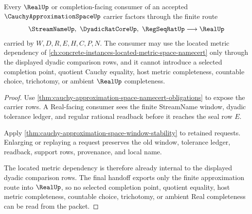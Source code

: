 \begin{theorem}
\label{thm:cauchy-approximation-space-real-handoff}
Every $\RealUp$ or completion-facing consumer of an accepted $\CauchyApproximationSpaceUp$ carrier factors through the finite route
$$
\StreamNameUp,\ \DyadicRatCoreUp,\ \RegSeqRatUp \longrightarrow \RealUp
$$
carried by $W,D,R,E,H,C,P,N$. The consumer may use the located metric dependency of \autoref{ch:concrete-instances-located-metric-space-namecert} only through the displayed dyadic comparison rows, and it cannot introduce a selected completion point, quotient Cauchy equality, host metric completeness, countable choice, trichotomy, or ambient $\RealUp$ completeness.
\end{theorem}
\begin{proof}
Use \autoref{thm:cauchy-approximation-space-namecert-obligations} to expose the carrier rows. A Real-facing consumer sees the finite StreamName window, dyadic tolerance ledger, and regular rational readback before it reaches the seal row $E$.

Apply \autoref{thm:cauchy-approximation-space-window-stability} to retained requests. Enlarging or replaying a request preserves the old window, tolerance ledger, readback, support rows, provenance, and local name.

The located metric dependency is therefore already internal to the displayed dyadic comparison rows. The final handoff exports only the finite approximation route into $\RealUp$, so no selected completion point, quotient equality, host metric completeness, countable choice, trichotomy, or ambient Real completeness can be read from the packet.
\end{proof}

\begin{closurestatus}{\CauchyApproximationSpaceUp}
  \theoryclosure{\seedClosure}
  \formalstatus{\unformalizedV}
\end{closurestatus}
